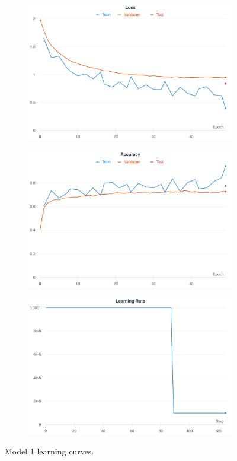 \documentclass[twocolumn]{article}
\begin{document}
\begin{figure}
    \centering
    \begin{subfigure}{.8\linewidth}
        \includegraphics[width=\linewidth]{Figures/loss.png}
    \end{subfigure}
    \begin{subfigure}{.8\linewidth}
        \includegraphics[width=\linewidth]{Figures/accuracy.png}
    \end{subfigure}
    \begin{subfigure}{.8\linewidth}
        \includegraphics[width=\linewidth]{Figures/lr.png}
    \end{subfigure}
    \caption{Model 1 learning curves.}
    \label{fig:learning-curves}
\end{figure}
\end{document}
